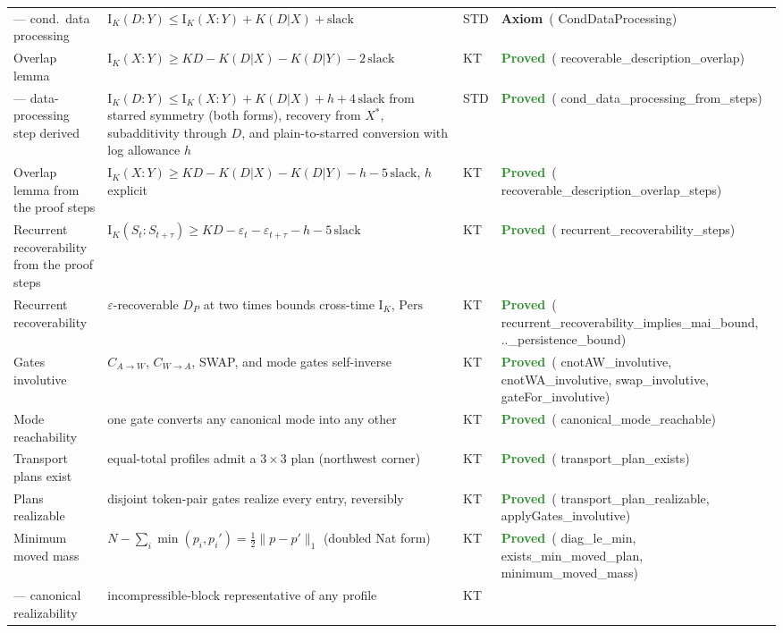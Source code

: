 \documentclass[11pt,a4paper]{article}
\newcommand{\lean}[1]{{\ttfamily\small
  \let\leanunderscore\_\def\_{\leanunderscore\allowbreak}#1}}
\newcommand{\Ik}{\mathrm{I}_K}
\newcommand{\stproved}{\textcolor{ForestGreen}{\textbf{Proved}}}
\newcommand{\staxiom}{\textcolor{bcomblue}{\textbf{Axiom}}}
\begin{document}
{\begin{longtable}{@{}p{2.1cm}p{6.6cm}p{1.0cm}p{2.6cm}@{}}
--- cond.\ data processing & $\Ik(D{:}Y)\le\Ik(X{:}Y)+K(D|X)+\mathrm{slack}$ & STD &
  \staxiom\ (\lean{CondDataProcessing}) \\
Overlap lemma & $\Ik(X{:}Y)\ge K D-K(D|X)-K(D|Y)-2\,\mathrm{slack}$ & KT &
  \stproved\ (\lean{recoverable\_description\_overlap}) \\
--- data-processing step derived & $\Ik(D{:}Y)\le\Ik(X{:}Y)+K(D|X)+h+4\,\mathrm{slack}$ from starred symmetry (both forms), recovery from $X^*$, subadditivity through $D$, and plain-to-starred conversion with log allowance $h$ & STD &
  \stproved\ (\lean{cond\_\allowbreak data\_\allowbreak processing\_\allowbreak from\_\allowbreak steps}) \\
Overlap lemma from the proof steps & $\Ik(X{:}Y)\ge K D-K(D|X)-K(D|Y)-h-5\,\mathrm{slack}$, $h$ explicit & KT &
  \stproved\ (\lean{recoverable\_\allowbreak description\_\allowbreak overlap\_\allowbreak steps}) \\
Recurrent recoverability from the proof steps & $\Ik(S_t{:}S_{t+\tau})\ge K D-\varepsilon_t-\varepsilon_{t+\tau}-h-5\,\mathrm{slack}$ & KT &
  \stproved\ (\lean{recurrent\_\allowbreak recoverability\_\allowbreak steps}) \\
Recurrent recoverability & $\varepsilon$-recoverable $D_P$ at two times bounds cross-time $\Ik$, $\mathrm{Pers}$ & KT &
  \stproved\ (\lean{recurrent\_recoverability\_implies\_mai\_bound}, \lean{..\_persistence\_bound}) \\
Gates involutive & $C_{A\to W}$, $C_{W\to A}$, SWAP, and mode gates self-inverse & KT &
  \stproved\ (\lean{cnotAW\_involutive}, \lean{cnotWA\_involutive}, \lean{swap\_involutive}, \lean{gateFor\_involutive}) \\
Mode reachability & one gate converts any canonical mode into any other & KT &
  \stproved\ (\lean{canonical\_mode\_reachable}) \\
Transport plans exist & equal-total profiles admit a $3\times3$ plan (northwest corner) & KT &
  \stproved\ (\lean{transport\_plan\_exists}) \\
Plans realizable & disjoint token-pair gates realize every entry, reversibly & KT &
  \stproved\ (\lean{transport\_plan\_realizable}, \lean{applyGates\_involutive}) \\
Minimum moved mass & $N-\sum_i\min(p_i,p_i')=\tfrac12\lVert p-p'\rVert_1$ (doubled \lean{Nat} form) & KT &
  \stproved\ (\lean{diag\_le\_min}, \lean{exists\_min\_moved\_plan}, \lean{minimum\_moved\_mass}) \\
--- canonical realizability & incompressible-block representative of any profile & KT &

\end{longtable}}
\end{document}
